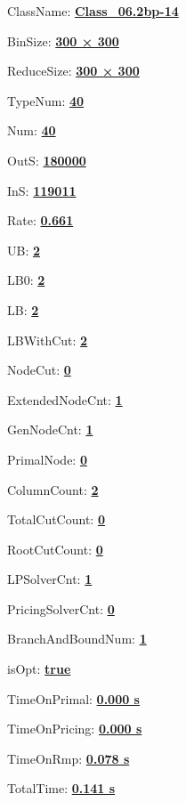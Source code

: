 \documentclass[11pt]{article}
\begin{document}
\pagestyle{empty}


ClassName: \underline{\textbf{Class_06.2bp-14}}
\par
BinSize: \underline{\textbf{300 × 300}}
\par
ReduceSize: \underline{\textbf{300 × 300}}
\par
TypeNum: \underline{\textbf{40}}
\par
Num: \underline{\textbf{40}}
\par
OutS: \underline{\textbf{180000}}
\par
InS: \underline{\textbf{119011}}
\par
Rate: \underline{\textbf{0.661}}
\par
UB: \underline{\textbf{2}}
\par
LB0: \underline{\textbf{2}}
\par
LB: \underline{\textbf{2}}
\par
LBWithCut: \underline{\textbf{2}}
\par
NodeCut: \underline{\textbf{0}}
\par
ExtendedNodeCnt: \underline{\textbf{1}}
\par
GenNodeCnt: \underline{\textbf{1}}
\par
PrimalNode: \underline{\textbf{0}}
\par
ColumnCount: \underline{\textbf{2}}
\par
TotalCutCount: \underline{\textbf{0}}
\par
RootCutCount: \underline{\textbf{0}}
\par
LPSolverCnt: \underline{\textbf{1}}
\par
PricingSolverCnt: \underline{\textbf{0}}
\par
BranchAndBoundNum: \underline{\textbf{1}}
\par
isOpt: \underline{\textbf{true}}
\par
TimeOnPrimal: \underline{\textbf{0.000 s}}
\par
TimeOnPricing: \underline{\textbf{0.000 s}}
\par
TimeOnRmp: \underline{\textbf{0.078 s}}
\par
TotalTime: \underline{\textbf{0.141 s}}
\par
\newpage
\end{document}
